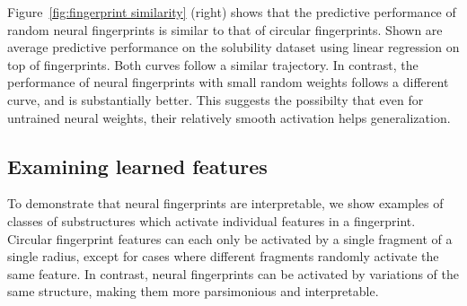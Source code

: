 \documentclass{article}
\begin{document}
Figure~\ref{fig:fingerprint similarity} (right) shows that the predictive performance of random neural fingerprints is similar to that of circular fingerprints.
Shown are average predictive performance on the \citet{delaney_data_2004} solubility dataset using linear regression on top of fingerprints.
Both curves follow a similar trajectory.
In contrast, the performance of neural fingerprints with small random weights follows a different curve, and is substantially better.
This suggests the possibilty that even for untrained neural weights, their relatively smooth activation helps generalization.

\subsection{Examining learned features}
To demonstrate that neural fingerprints are interpretable, we show examples of classes of substructures which activate individual features in a fingerprint.
Circular fingerprint features can each only be activated by a single fragment of a single radius, except for cases where different fragments randomly activate the same feature.
In contrast, neural fingerprints can be activated by variations of the same structure, making them more parsimonious and interpretable.
\end{document}
